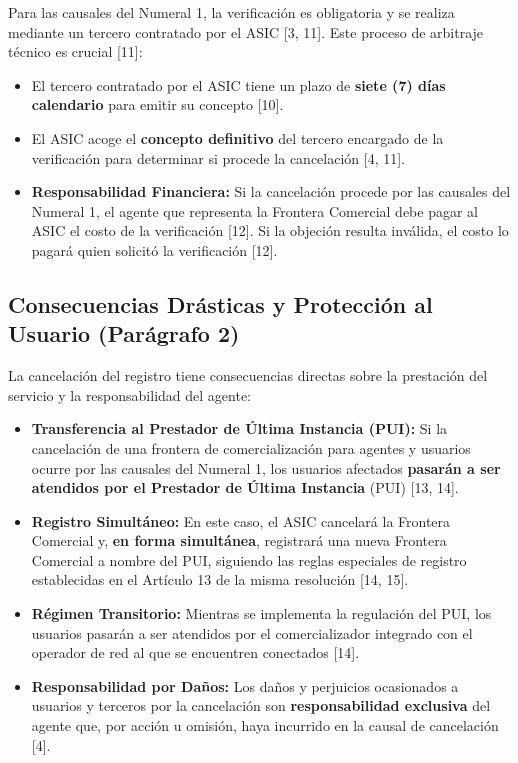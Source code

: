 \documentclass[a5paper]{book}%
\begin{document}
Para las causales del Numeral 1, la verificación es obligatoria y se realiza mediante un tercero contratado por el ASIC [3, 11]. Este proceso de arbitraje técnico es crucial [11]:

\begin{itemize}
	\item El tercero contratado por el ASIC tiene un plazo de \textbf{siete (7) días calendario} para emitir su concepto [10].
	\item El ASIC acoge el \textbf{concepto definitivo} del tercero encargado de la verificación para determinar si procede la cancelación [4, 11].
	\item \textbf{Responsabilidad Financiera:} Si la cancelación procede por las causales del Numeral 1, el agente que representa la Frontera Comercial debe pagar al ASIC el costo de la verificación [12]. Si la objeción resulta inválida, el costo lo pagará quien solicitó la verificación [12].
\end{itemize}

\subsection{Consecuencias Drásticas y Protección al Usuario (Parágrafo 2)}

La cancelación del registro tiene consecuencias directas sobre la prestación del servicio y la responsabilidad del agente:

\begin{itemize}
	\item \textbf{Transferencia al Prestador de Última Instancia (PUI):} Si la cancelación de una frontera de comercialización para agentes y usuarios ocurre por las causales del Numeral 1, los usuarios afectados \textbf{pasarán a ser atendidos por el Prestador de Última Instancia} (PUI) [13, 14].
	\item \textbf{Registro Simultáneo:} En este caso, el ASIC cancelará la Frontera Comercial y, \textbf{en forma simultánea}, registrará una nueva Frontera Comercial a nombre del PUI, siguiendo las reglas especiales de registro establecidas en el Artículo 13 de la misma resolución [14, 15].
	\item \textbf{Régimen Transitorio:} Mientras se implementa la regulación del PUI, los usuarios pasarán a ser atendidos por el comercializador integrado con el operador de red al que se encuentren conectados [14].
	\item \textbf{Responsabilidad por Daños:} Los daños y perjuicios ocasionados a usuarios y terceros por la cancelación son \textbf{responsabilidad exclusiva} del agente que, por acción u omisión, haya incurrido en la causal de cancelación [4].
\end{itemize}
\end{document}
